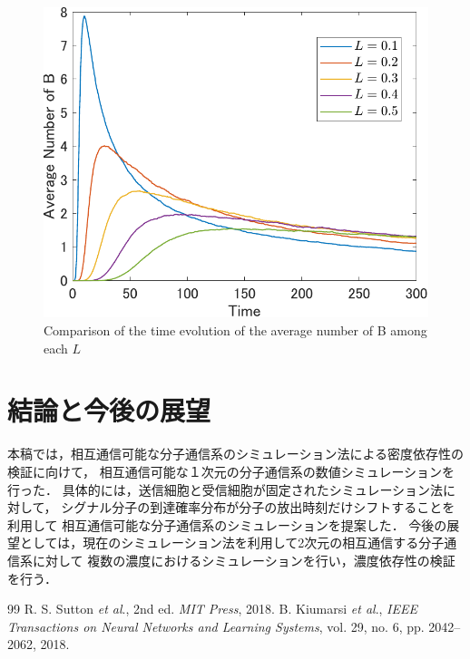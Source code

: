 \documentclass[twocolumn]{jarticle}
\begin{document}
\begin{figure}[tb]
    \centering
    \includegraphics[width=\columnwidth]{figures/figure_name.pdf}
    \caption{Comparison of the time evolution of the average number of B among each $L$}
    \label{fig:simulation}
\end{figure}


\section{結論と今後の展望}
本稿では，相互通信可能な分子通信系のシミュレーション法による密度依存性の検証に向けて，
相互通信可能な１次元の分子通信系の数値シミュレーションを行った．
具体的には，送信細胞と受信細胞が固定されたシミュレーション法に対して，
シグナル分子の到達確率分布が分子の放出時刻だけシフトすることを利用して
相互通信可能な分子通信系のシミュレーションを提案した．
今後の展望としては，現在のシミュレーション法を利用して2次元の相互通信する分子通信系に対して
複数の濃度におけるシミュレーションを行い，濃度依存性の検証を行う．



\begin{thebibliography} {99}
     R. S. Sutton {\it et al}., %
    2nd ed. { \it MIT Press}, 2018.
     B. Kiumarsi {\it et al}., 
    {\it IEEE Transactions on Neural Networks and Learning Systems}, vol. 29, no. 6, pp. 2042–2062, 2018.
\end{thebibliography}
\end{document}
